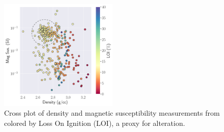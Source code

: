 \begin{figure}[!htb]
    \begin{center}
    \includegraphics[width=0.5\textwidth]{figures/phys-props-cross-plot-annotated.png}
    \end{center}
\caption{
    Cross plot of density and magnetic susceptibility measurements from \cite{Cutts2021} colored by Loss On Ignition (LOI), a proxy for alteration.
}
\label{fig:phys-props-cross-plot}
\end{figure}

